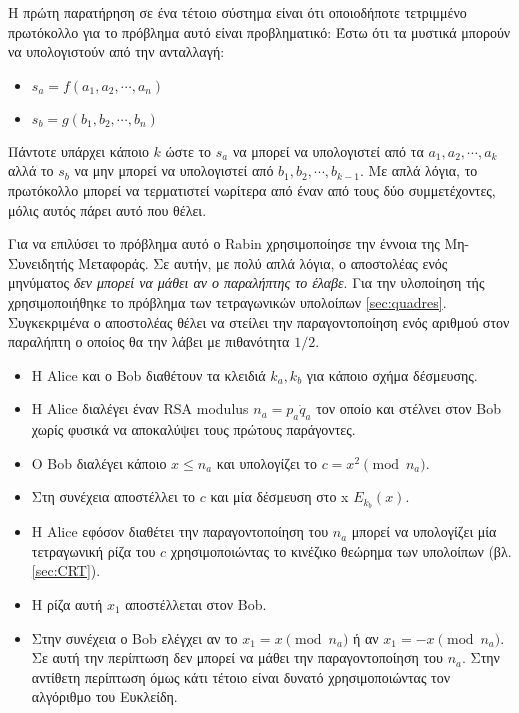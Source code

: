 Η πρώτη παρατήρηση σε ένα τέτοιο σύστημα είναι ότι οποιοδήποτε τετριμμένο πρωτόκολλο για το πρόβλημα αυτό είναι προβληματικό: 
Έστω ότι τα μυστικά μπορούν να υπολογιστούν από την ανταλλαγή:
\begin{itemize}
\item $s_a = f(a_1,a_2, \cdots , a_n)$
\item $s_b = g(b_1,b_2, \cdots, b_n)$
\end{itemize}
Πάντοτε υπάρχει κάποιο $k$ ώστε το $s_a$ να μπορεί να υπολογιστεί από τα $a_1,a_2, \cdots , a_k$ αλλά το $s_b$ να μην μπορεί να υπολογιστεί από $b_1,b_2, \cdots, b_{k-1}$. Με απλά λόγια, το πρωτόκολλο μπορεί να τερματιστεί νωρίτερα από έναν από τους δύο συμμετέχοντες, μόλις αυτός πάρει αυτό που θέλει.

Για να επιλύσει το πρόβλημα αυτό ο Rabin χρησιμοποίησε την έννοια της Μη-Συνειδητής Μεταφοράς. Σε αυτήν, με πολύ απλά λόγια, ο αποστολέας ενός μηνύματος \emph{δεν μπορεί να μάθει αν ο παραλήπτης το έλαβε}. Για την υλοποίηση τής χρησιμοποιήθηκε το πρόβλημα των τετραγωνικών υπολοίπων \ref{sec:quadres}. Συγκεκριμένα ο αποστολέας θέλει  να στείλει την παραγοντοποίηση ενός αριθμού στον παραλήπτη ο οποίος θα την λάβει με πιθανότητα ${1}/{2}$.

\begin{itemize}
\item Η Alice και ο Bob διαθέτουν τα κλειδιά $k_a, k_b$ για κάποιο σχήμα δέσμευσης.
\item H Alice διαλέγει έναν \gls{RSA} modulus $n_a = p_a \dot q_a$ τον οποίο και στέλνει στον Bob χωρίς φυσικά να αποκαλύψει τους πρώτους παράγοντες.
\item O Bob διαλέγει κάποιο $x \leq n_a$ και υπολογίζει το $c = x^2 \pmod  n_a$. 
\item Στη συνέχεια αποστέλλει το $c$ και μία δέσμευση στο x $E_{k_b}(x)$.
\item Η Alice εφόσον διαθέτει την παραγοντοποίηση του $n_a$ μπορεί να υπολογίζει μία τετραγωνική ρίζα του $c$ χρησιμοποιώντας το κινέζικο θεώρημα των υπολοίπων (βλ. \ref{sec:CRT}).
\item Η ρίζα αυτή $x_1$ αποστέλλεται στον Bob.
\item Στην συνέχεια ο Bob ελέγχει αν το $x_1=x \pmod n_a$ ή αν $x_1= - x \pmod n_a$. Σε αυτή την περίπτωση δεν μπορεί να μάθει την παραγοντοποίηση του $n_a$. Στην αντίθετη περίπτωση όμως κάτι τέτοιο είναι δυνατό χρησιμοποιώντας τον αλγόριθμο του Ευκλείδη.
\end{itemize}

